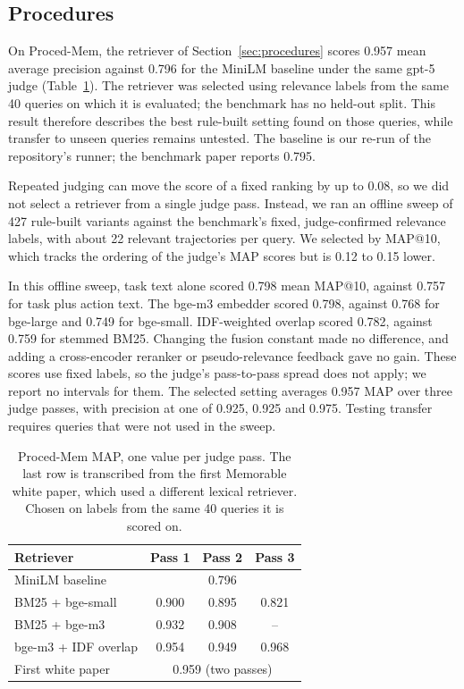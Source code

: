\subsection{Procedures}
\label{sec:procedmem}

On Proced-Mem, the retriever of Section~\ref{sec:procedures} scores 0.957 mean average precision against 0.796 for the MiniLM baseline under the same gpt-5 judge (Table~\ref{tab:procedmem}). The retriever was selected using relevance labels from the same 40 queries on which it is evaluated; the benchmark has no held-out split. This result therefore describes the best rule-built setting found on those queries, while transfer to unseen queries remains untested. The baseline is our re-run of the repository's runner; the benchmark paper reports 0.795.

Repeated judging can move the score of a fixed ranking by up to 0.08, so we did not select a retriever from a single judge pass. Instead, we ran an offline sweep of 427 rule-built variants against the benchmark's fixed, judge-confirmed relevance labels, with about 22 relevant trajectories per query. We selected by MAP@10, which tracks the ordering of the judge's MAP scores but is 0.12 to 0.15 lower.

In this offline sweep, task text alone scored 0.798 mean MAP@10, against 0.757 for task plus action text. The bge-m3 embedder scored 0.798, against 0.768 for bge-large and 0.749 for bge-small. IDF-weighted overlap scored 0.782, against 0.759 for stemmed BM25. Changing the fusion constant made no difference, and adding a cross-encoder reranker or pseudo-relevance feedback gave no gain. These scores use fixed labels, so the judge's pass-to-pass spread does not apply; we report no intervals for them. The selected setting averages 0.957 MAP over three judge passes, with precision at one of 0.925, 0.925 and 0.975. Testing transfer requires queries that were not used in the sweep.

\begin{table}[H]
\caption{Proced-Mem MAP, one value per judge pass. The last row is transcribed from the first Memorable white paper, which used a different lexical retriever. \tun{} Chosen on labels from the same 40 queries it is scored on.}
\label{tab:procedmem}
\centering
\small
\setlength{\tabcolsep}{3pt}
\begin{tabular}{@{}lccc@{}}
\toprule
Retriever & Pass 1 & Pass 2 & Pass 3 \\
\midrule
MiniLM baseline & \multicolumn{3}{c}{0.796} \\
BM25 + bge-small & 0.900 & 0.895 & 0.821 \\
BM25 + bge-m3 & 0.932 & 0.908 & -- \\
bge-m3 + IDF overlap\tun{} & 0.954 & 0.949 & 0.968 \\
First white paper\pub{} & \multicolumn{3}{c}{0.959 (two passes)} \\
\bottomrule
\end{tabular}
\end{table}

